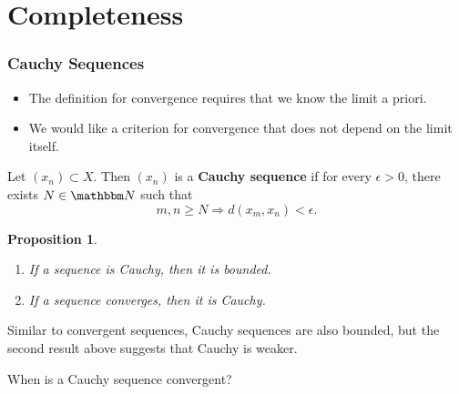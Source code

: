 \documentclass[9pt,aspectratio=169]{beamer}
\newcommand{\NN}{\mathbbm N}
\renewcommand{\implies}{\Rightarrow}
\newtheorem{proposition}[theorem]{Proposition}
\begin{document}
\section{Completeness}

\begin{frame}[allowframebreaks]
    \frametitle{Cauchy Sequences}
    \begin{itemize}
        \item The definition for convergence requires that we know the limit
        a priori.
        \item We would like a criterion for convergence that does not depend
        on the limit itself.
    \end{itemize}
    \begin{definition}
        Let $(x_n) \subset X$. Then $(x_n)$ is a \textbf{Cauchy sequence} if
        for every $\epsilon > 0$, there exists $N \in \NN$ such that
        \begin{equation*}
            m, n \geq N \implies d(x_m, x_n) < \epsilon.
        \end{equation*}
    \end{definition}
    \framebreak
    \begin{proposition}
        \begin{enumerate}
            \item If a sequence is Cauchy, then it is bounded.
            \item If a sequence converges, then it is Cauchy.
        \end{enumerate}
    \end{proposition}
    Similar to convergent sequences, Cauchy sequences are also bounded, but
    the second result above suggests that Cauchy is weaker.

    When is a Cauchy sequence convergent?
\end{frame}
\end{document}
